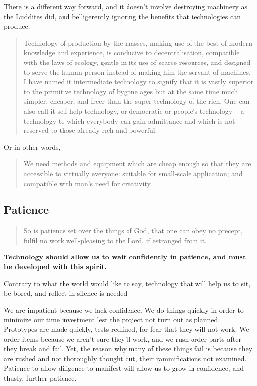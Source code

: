 \documentclass[letterpaper]{article}
\begin{document}
    There is a different way forward, and it doesn't involve destroying machinery as the Luddites did, and belligerently ignoring the benefits that technologies can produce.

    \begin{quote}
      Technology of production by the masses, making use of the best of modern knowledge and experience, is conducive to decentralisation, compatible with the laws of ecology, gentle in its use of scarce resources, and designed to serve the human person instead of making him the servant of machines. I have named it intermediate technology to signify that it is vastly superior to the primitive technology of bygone ages but at the same time much simpler, cheaper, and freer than the super-technology of the rich. One can also call it self-help technology, or democratic or people's technology -- a technology to which everybody can gain admittance and which is not reserved to those already rich and powerful.
    \end{quote}

    Or in other words,

    \begin{quote}
      We need methods and equipment which are cheap enough so that they are accessible to virtually everyone: suitable for small-scale application; and compatible with man's need for creativity.
    \end{quote}

  \subsection{Patience}

    \begin{quote}
      So is patience set over the things of God, that one can obey no precept, fulfil no work well-pleasing to the Lord, if estranged from it.
    \end{quote}

    \textbf{Technology should allow us to wait confidently in patience, and must be developed with this spirit.}

    Contrary to what the world would like to say, technology that will help us to sit, be bored, and reflect in silence is needed.

    We are impatient because we lack confidence. We do things quickly in order to minimize our time investment lest the project not turn out as planned. Prototypes are made quickly, tests redlined, for fear that they will not work. We order items because we aren't sure they'll work, and we rush order parts after they break and fail. Yet, the reason why many of these things fail is because they are rushed and not thoroughly thought out, their rammifications not examined. Patience to allow diligence to manifest will allow us to grow in confidence, and thusly, further patience.
\end{document}
